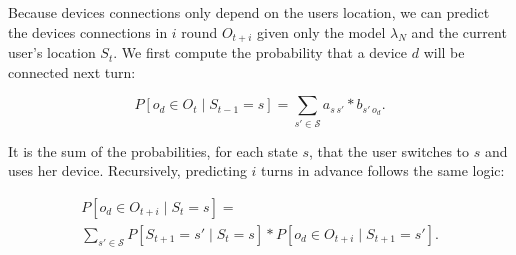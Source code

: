 Because devices connections only depend on the users location, we can predict the devices connections in $i$ round $O_{t+i}$ given only the model $\lambda_N$ and the current user's location $S_t$. We first compute the probability that a device $d$ will be connected next turn:

$$
P\left[ o_d \in O_{t} \mid S_{t-1} = s \right] = 
\sum\limits_{s' \in \mathcal{S}} 
a_{s\,s'} * b_{s'\,o_d}.
$$

It is the sum of the probabilities, for each state $s$, that the user switches to $s$ and uses her device.
Recursively, predicting $i$ turns in advance follows the same logic:

\begin{multline*}
P\left[ o_d \in O_{t+i} \mid S_{t} = s \right] = \\
\sum\limits_{s' \in \mathcal{S}}
P\left[ S_{t+1} = s' \mid S_t = s \right] * 
P\left[ o_d \in O_{t+i} \mid S_{t+1} = s'\right].
\end{multline*}




